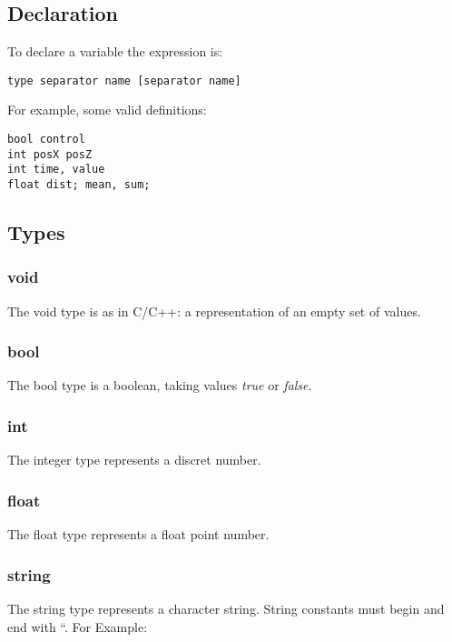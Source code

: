 \documentclass[ letterpaper,12pt]{article}
\begin{document}
\subsection{Declaration}

To declare a variable the expression is:

\begin{verbatim}
type separator name [separator name]
\end{verbatim}

For example, some valid definitions:

\begin{verbatim}
bool control
int posX posZ
int time, value
float dist; mean, sum;
\end{verbatim}

\subsection{Types}

\subsubsection{void}

The void type is as in C/C++: a representation of an empty set of values.

\subsubsection{bool}

The bool type is a boolean, taking values {\it true} or {\it false}.

\subsubsection{int}

The integer type represents a discret number.

\subsubsection{float}

The float type represents a float point number.

\subsubsection{string}

The string type represents a character string. String constants must begin and
end with ``. For Example:
\end{document}
